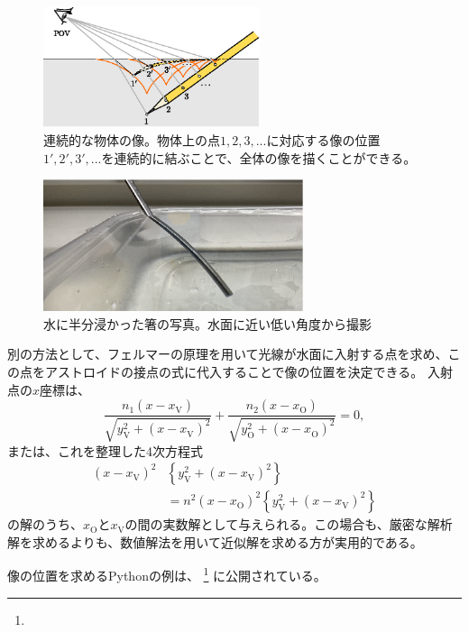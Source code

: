 \documentclass[twocolumn]{article}
\begin{document}
\begin{figure}[h]
	\centering
	\includegraphics*[width=2.5in]{figs/g242.eps}
	\caption{連続的な物体の像。物体上の点$1, 2, 3, ...$に対応する像の位置$1', 2', 3', ...$を連続的に結ぶことで、全体の像を描くことができる。}
	\label{fig:extended_image}
\end{figure}

\begin{figure}[h]
	\centering
	\includegraphics[width=3in]{figs/img_1805_2.eps}
	\caption{水に半分浸かった箸の写真。水面に近い低い角度から撮影}
	\label{fig:picture}
\end{figure}
	
別の方法として、フェルマーの原理を用いて光線が水面に入射する点を求め、この点をアストロイドの接点の式に代入することで像の位置を決定できる。
入射点の$x$座標は、
\[
\dfrac{n_1 \left( x - x_{\mathrm{V}}^{} \right)}{\sqrt{ y_{\mathrm{V}}^2 + \left( x - x_{\mathrm{V}}^{} \right)^2 }}
+\dfrac{n_2 \left( x - x_{\mathrm{O}}^{} \right)}{\sqrt{ y_{\mathrm{O}}^2 + \left( x - x_{\mathrm{O}}^{} \right)^2 }}
= 0,
\]
または、これを整理した4次方程式
\[ \begin{aligned}
	\left( x - x_{\mathrm{V}}^{} \right)^2 & \left\{ y_{\mathrm{V}}^2 + \left(x - x_{\mathrm{V}}^{} \right)^2 \right\}\\
	&= n^2 \left( x - x_{\mathrm{O}}^{} \right)^2 \left\{ y_{\mathrm{V}}^2 + \left(x - x_{\mathrm{V}}^{} \right)^2 \right\}
\end{aligned}
\]
の解のうち、$x_{\mathrm{O}}^{}$と$x_{\mathrm{V}}^{}$の間の実数解として与えられる。この場合も、厳密な解析解を求めるよりも、数値解法を用いて近似解を求める方が実用的である。

像の位置を求めるPythonの例は、
\href{https://github.com/mingshey/python_projects/blob/main/Refraction_Image.ipynb}%
{}\footnote{} に公開されている。
\end{document}
